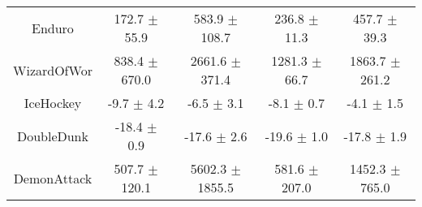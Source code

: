 \begin{table}[H]
{\begin{tabular}{ccccc}
Enduro        &       172.7 $\pm$ 55.9 &     583.9 $\pm$ 108.7 &      236.8 $\pm$ 11.3 &      457.7 $\pm$ 39.3 \\
WizardOfWor   &      838.4 $\pm$ 670.0 &    2661.6 $\pm$ 371.4 &     1281.3 $\pm$ 66.7 &    1863.7 $\pm$ 261.2 \\
IceHockey     &         -9.7 $\pm$ 4.2 &        -6.5 $\pm$ 3.1 &        -8.1 $\pm$ 0.7 &        -4.1 $\pm$ 1.5 \\
DoubleDunk    &        -18.4 $\pm$ 0.9 &       -17.6 $\pm$ 2.6 &       -19.6 $\pm$ 1.0 &       -17.8 $\pm$ 1.9 \\
DemonAttack   &      507.7 $\pm$ 120.1 &   5602.3 $\pm$ 1855.5 &     581.6 $\pm$ 207.0 &    1452.3 $\pm$ 765.0 \\
\bottomrule
\end{tabular}}
\end{table}

